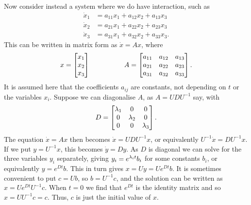 \documentclass[reqno]{amsart}
\theoremstyle{definition}
\begin{document}
Now consider instead a system where we do have interaction, such as
\begin{align*}
 \dot{x}_1 &= a_{11}x_1 + a_{12}x_2 + a_{13}x_3 \\
 \dot{x}_2 &= a_{21}x_1 + a_{22}x_2 + a_{23}x_3 \\
 \dot{x}_3 &= a_{31}x_1 + a_{32}x_2 + a_{33}x_3.
\end{align*}
This can be written in matrix form as $\dot{x}=Ax$, where 
\[ x = \left[\begin{matrix} x_1\\ x_2\\ x_3\end{matrix}\right] \hspace{5em}
   A = \left[\begin{matrix} 
        a_{11} & a_{12} & a_{13} \\
        a_{21} & a_{22} & a_{23} \\
        a_{31} & a_{32} & a_{33}
       \end{matrix}\right].
\]
It is assumed here that the coefficients $a_{ij}$ are constants, not
depending on $t$ or the variables $x_i$.  Suppose we can diagonalise
$A$, as $A=UDU^{-1}$ say, with
\[ D = \left[\begin{matrix} \lambda_1 & 0 & 0 \\ 0 & \lambda_2 & 0 \\ 0 & 0 & \lambda_3 \end{matrix}\right]. \]
The equation $\dot{x}=Ax$ then becomes $\dot{x}=UDU^{-1}x$, or
equivalently $U^{-1}\dot{x}=DU^{-1}x$.  If we put $y=U^{-1}x$, this
becomes $\dot{y}=Dy$.  As $D$ is diagonal we can solve for the three
variables $y_i$ separately, giving $y_i=e^{\lambda_it}b_i$ for some
constants $b_i$, or equivalently $y=e^{Dt}b$.  This in turn gives
$x=Uy=Ue^{Dt}b$.  It is sometimes convenient to put $c=Ub$, so
$b=U^{-1}c$, and the solution can be written as $x=Ue^{Dt}U^{-1}c$.
When $t=0$ we find that $e^{Dt}$ is the identity matrix and so
$x=UU^{-1}c=c$.  Thus, $c$ is just the initial value of $x$.
\end{document}
